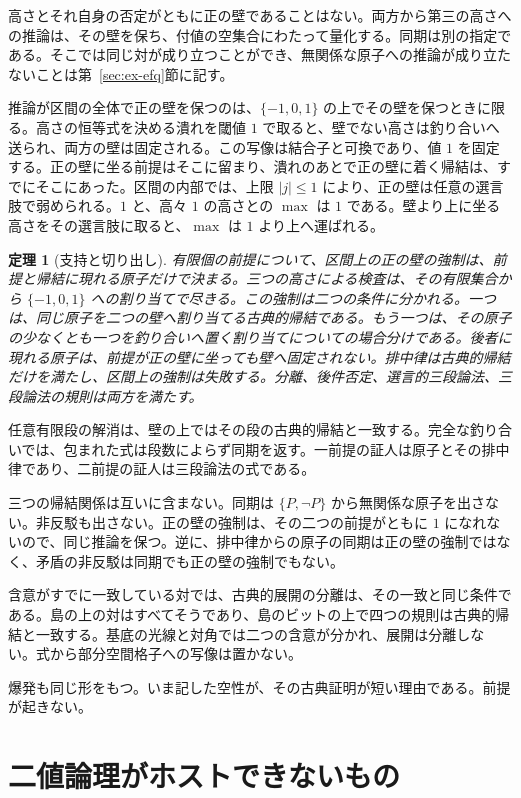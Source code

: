 \documentclass[a4paper]{article}
\newtheorem{theorem}{定理}[section]
\theoremstyle{definition}
\begin{document}
高さとそれ自身の否定がともに正の壁であることはない。両方から第三の高さへの推論は、その壁を保ち、付値の空集合にわたって量化する。同期は別の指定である。そこでは同じ対が成り立つことができ、無関係な原子への推論が成り立たないことは第~\ref{sec:ex-efq}節に記す。

推論が区間の全体で正の壁を保つのは、\(\{-1,0,1\}\) の上でその壁を保つときに限る。高さの恒等式を決める潰れを閾値 \(1\) で取ると、壁でない高さは釣り合いへ送られ、両方の壁は固定される。この写像は結合子と可換であり、値 \(1\) を固定する。正の壁に坐る前提はそこに留まり、潰れのあとで正の壁に着く帰結は、すでにそこにあった。区間の内部では、上限 \(|j|\le 1\) により、正の壁は任意の選言肢で弱められる。\(1\) と、高々 \(1\) の高さとの \(\max\) は \(1\) である。壁より上に坐る高さをその選言肢に取ると、\(\max\) は \(1\) より上へ運ばれる。

\begin{theorem}[支持と切り出し]
\label{thm:cut}
有限個の前提について、区間上の正の壁の強制は、前提と帰結に現れる原子だけで決まる。三つの高さによる検査は、その有限集合から \(\{-1,0,1\}\) への割り当てで尽きる。この強制は二つの条件に分かれる。一つは、同じ原子を二つの壁へ割り当てる古典的帰結である。もう一つは、その原子の少なくとも一つを釣り合いへ置く割り当てについての場合分けである。後者に現れる原子は、前提が正の壁に坐っても壁へ固定されない。排中律は古典的帰結だけを満たし、区間上の強制は失敗する。分離、後件否定、選言的三段論法、三段論法の規則は両方を満たす。
\end{theorem}

任意有限段の解消は、壁の上ではその段の古典的帰結と一致する。完全な釣り合いでは、包まれた式は段数によらず同期を返す。一前提の証人は原子とその排中律であり、二前提の証人は三段論法の式である。

三つの帰結関係は互いに含まない。同期は \(\{P,\neg P\}\) から無関係な原子を出さない。非反駁も出さない。正の壁の強制は、その二つの前提がともに \(1\) になれないので、同じ推論を保つ。逆に、排中律からの原子の同期は正の壁の強制ではなく、矛盾の非反駁は同期でも正の壁の強制でもない。

含意がすでに一致している対では、古典的展開の分離は、その一致と同じ条件である。島の上の対はすべてそうであり、島のビットの上で四つの規則は古典的帰結と一致する。基底の光線と対角では二つの含意が分かれ、展開は分離しない。式から部分空間格子への写像は置かない。

爆発も同じ形をもつ。いま記した空性が、その古典証明が短い理由である。前提が起きない。

\section{二値論理がホストできないもの}
\label{sec:examples}
\end{document}
